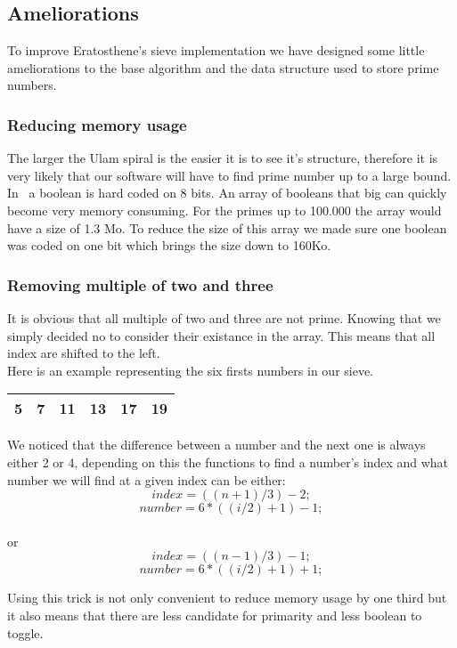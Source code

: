 \subsection{Ameliorations}

To improve Eratosthene's sieve implementation we have designed some little ameliorations to the base algorithm and the data structure used to store prime numbers.

\subsubsection{Reducing memory usage}
The larger the Ulam spiral is the easier it is to see it's structure, therefore it is very likely that our software will have to find prime number up to a large bound.\\In \CXX~a boolean is hard coded on 8 bits. An array of booleans that big can quickly become very memory consuming. For the primes up to 100.000 the array would have a size of 1.3 Mo. To reduce the size of this array we made sure one boolean was coded on one bit which brings the size down to 160Ko.

\subsubsection{Removing multiple of two and three }
It is obvious that all multiple of two and three are not prime. Knowing that we simply decided no to consider their existance in the array. This means that all index are shifted to the left.\\ Here is an example representing the six firsts numbers in our sieve.

\begin{center}
   \begin{tabular}{ |*{6}{c|} }
     \hline
     5 & 7 & 11 & 13 & 17 & 19 \\ \hline
     
   \end{tabular}
\end{center}  

 We noticed that the difference between a number and the next one is always either 2 or 4, depending on this the functions to find a number's index and what number we will find at a given index can be either: $$index = ((n + 1) / 3) - 2;$$ $$number = 6 * ((i / 2) + 1) - 1;$$ \\or $$index = ((n - 1) / 3) - 1;$$ $$number = 6 * ((i / 2) + 1) + 1;$$

Using this trick is not only convenient to reduce memory usage by one third but it also means that there are less candidate for primarity and less boolean to toggle. 


